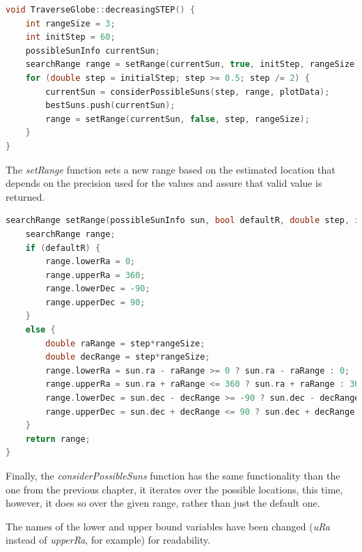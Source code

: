 \begin{minipage}{\linewidth}
	\begin{lstlisting}[language=c, caption=Decreasing the range and increasing the precision]
void TraverseGlobe::decreasingSTEP() {
	int rangeSize = 3;
	int initStep = 60;
	possibleSunInfo currentSun;
	searchRange range = setRange(currentSun, true, initStep, rangeSize);
	for (double step = initialStep; step >= 0.5; step /= 2) {
		currentSun = considerPossibleSuns(step, range, plotData);
		bestSuns.push(currentSun);
		range = setRange(currentSun, false, step, rangeSize);
	}
}\end{lstlisting}
\end{minipage}

The \textit{setRange} function sets a new range based on the estimated location that depends on the precision used for the values and assure that valid value is returned.

\begin{minipage}{\linewidth}
	\begin{lstlisting}[language=c, caption=Setting the new range based on the estimated source location]
searchRange setRange(possibleSunInfo sun, bool defaultR, double step, int rangeSize) {
	searchRange range;
	if (defaultR) {
		range.lowerRa = 0;
		range.upperRa = 360;
		range.lowerDec = -90;
		range.upperDec = 90;
	}
	else {
		double raRange = step*rangeSize;
		double decRange = step*rangeSize;
		range.lowerRa = sun.ra - raRange >= 0 ? sun.ra - raRange : 0;
		range.upperRa = sun.ra + raRange <= 360 ? sun.ra + raRange : 360;
		range.lowerDec = sun.dec - decRange >= -90 ? sun.dec - decRange : -90;
		range.upperDec = sun.dec + decRange <= 90 ? sun.dec + decRange : 90;
	}
	return range;
}\end{lstlisting}
\end{minipage}

Finally, the \textit{considerPossibleSuns} function has the same functionality than the one from the previous chapter, it iterates over the possible locations, this time, however, it does so over the given range, rather than just the default one. 

The names of the lower and upper bound variables have been changed (\textit{uRa} instead of \textit{upperRa}, for example) for readability.

